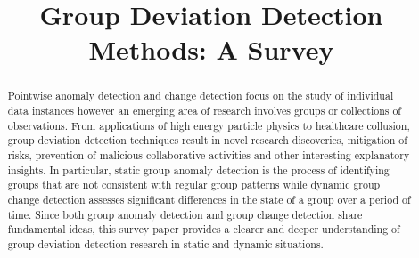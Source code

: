 \documentclass[format=acmsmall, screen=true]{acmart}
\begin{document}

\begin{abstract}
Pointwise anomaly detection and change detection focus on the study of individual data instances however an emerging area of research involves groups or collections of observations. From applications of high energy particle physics to healthcare  collusion,  group deviation detection techniques result in novel research discoveries, mitigation of risks,  prevention of  malicious collaborative activities and other interesting explanatory  insights.  In particular, static group anomaly detection   is the process of identifying groups that are not consistent with regular group patterns while dynamic group change detection  assesses significant differences in the state of a group  over a period of time. Since both group anomaly detection   and group change detection   share fundamental ideas, this survey paper provides a clearer and deeper understanding of group deviation detection  research in static and dynamic situations.  %
\end{abstract} 
 
 \title{  Group Deviation Detection Methods: A Survey }
\maketitle


 

 


  

 



\end{document}
